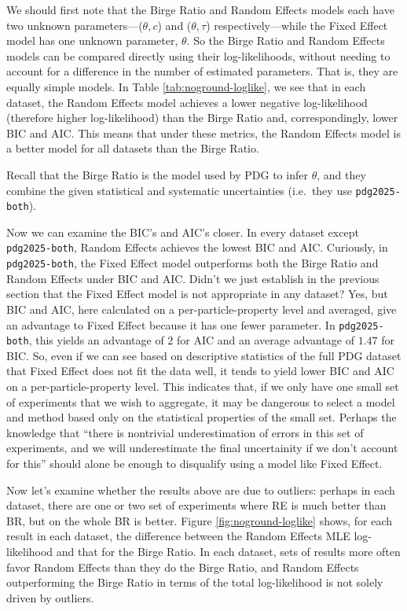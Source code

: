\documentclass[12pt]{article}
\begin{document}
We should first note that the Birge Ratio and Random Effects models each have two unknown parameters---($\theta,c$) and ($\theta,\tau$) respectively---while the Fixed Effect model has one unknown parameter, $\theta$. So the Birge Ratio and Random Effects models can be compared directly using their log-likelihoods, without needing to account for a difference in the number of estimated parameters. That is, they are equally simple models. In Table \ref{tab:noground-loglike}, we see that in each dataset, the Random Effects model achieves a lower negative log-likelihood (therefore higher log-likelihood) than the Birge Ratio and, correspondingly, lower BIC and AIC. This means that under these metrics, the Random Effects model is a better model for all datasets than the Birge Ratio.

Recall that the Birge Ratio is the model used by PDG to infer $\theta$, and they combine the given statistical and systematic uncertainties (i.e.~they use \texttt{pdg2025-both}).

Now we can examine the BIC's and AIC's closer. In every dataset except \texttt{pdg2025-both}, Random Effects achieves the lowest BIC and AIC. Curiously, in \texttt{pdg2025-both}, the Fixed Effect model outperforms both the Birge Ratio and Random Effects under BIC and AIC. Didn't we just establish in the previous section that the Fixed Effect model is not appropriate in any dataset? Yes, but BIC and AIC, here calculated on a per-particle-property level and averaged, give an advantage to Fixed Effect because it has one fewer parameter. In \texttt{pdg2025-both}, this yields an advantage of $2$ for AIC and an average advantage of $1.47$ for BIC. So, even if we can see based on descriptive statistics of the full PDG dataset that Fixed Effect does not fit the data well, it tends to yield lower BIC and AIC on a per-particle-property level. This indicates that, if we only have one small set of experiments that we wish to aggregate, it may be dangerous to select a model and method based only on the statistical properties of the small set. Perhaps the knowledge that ``there is nontrivial underestimation of errors in this set of experiments, and we will underestimate the final uncertainity if we don't account for this'' should alone be enough to disqualify using a model like Fixed Effect.

Now let's examine whether the results above are due to outliers: perhaps in each dataset, there are one or two set of experiments where RE is much better than BR, but on the whole BR is better. Figure \ref{fig:noground-loglike} shows, for each result in each dataset, the difference between the Random Effects MLE log-likelihood and that for the Birge Ratio. In each dataset, sets of results more often favor Random Effects than they do the Birge Ratio, and Random Effects outperforming the Birge Ratio in terms of the total log-likelihood is not solely driven by outliers.
\end{document}
